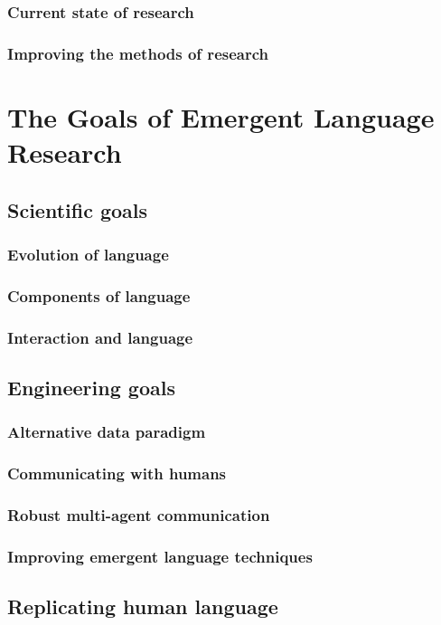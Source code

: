 \documentclass[letterpaper]{report}
\begin{document}
\subsection{Current state of research}

\subsection{Improving the methods of research}


\chapter{The Goals of Emergent Language Research}\label{sec:goals}
\section{Scientific goals}
\subsection{Evolution of language}
\subsection{Components of language}
\subsection{Interaction and language}
\section{Engineering goals}
\subsection{Alternative data paradigm}
\subsection{Communicating with humans}
\subsection{Robust multi-agent communication}
\subsection{Improving emergent language techniques}
\section{Replicating human language}
\end{document}
